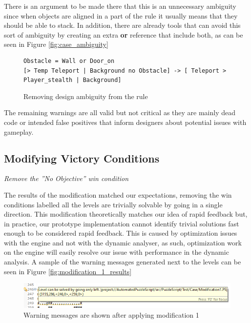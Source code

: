 There is an argument to be made there that this is an unnecessary ambiguity since when objects are aligned in a part of the rule it usually means that they should be able to stack. In addition, there are already tools that can avoid this sort of ambiguity by creating an extra \textbf{or} reference that include both, as can be seen in Figure \ref{fig:case_ambiguity}

\begin{figure}[!t]
\begin{lstlisting}[language=PuzzleScript]
Obstacle = Wall or Door_on
[> Temp Teleport | Background no Obstacle] -> [ Teleport > Player_stealth | Background]
\end{lstlisting}
\vspace*{-8pt}
\caption{Removing design ambiguity from the rule}
\label{fig:case_ambiguity_old}
\vspace*{-8pt}
\end{figure}

The remaining warnings are all valid but not critical as they are mainly dead code or intended false positives that inform designers about potential issues with gameplay.

\subsection{Modifying Victory Conditions}
\textit{Remove the ”No Objective” win condition}

The results of the modification matched our expectations, removing the win conditions labelled all the levels are trivially solvable by going in a single direction. This modification theoretically matches our idea of rapid feedback but, in practice, our prototype implementation cannot identify trivial solutions fast enough to be considered rapid feedback. This is caused by optimization issues with the engine and not with the dynamic analyser, as such, optimization work on the engine will easily resolve our issue with performance in the dynamic analysis. A sample of the warning messages generated next to the levels can be seen in Figure \ref{fig:modification_1_results}

\begin{figure}[!t]
    \centering
    \includegraphics[width=1\textwidth]{images/case_results/Modification_1_Results.png}
    \caption{Warning messages are shown after applying modification 1}
    \label{fig:modification_1_results_old}
\end{figure}

